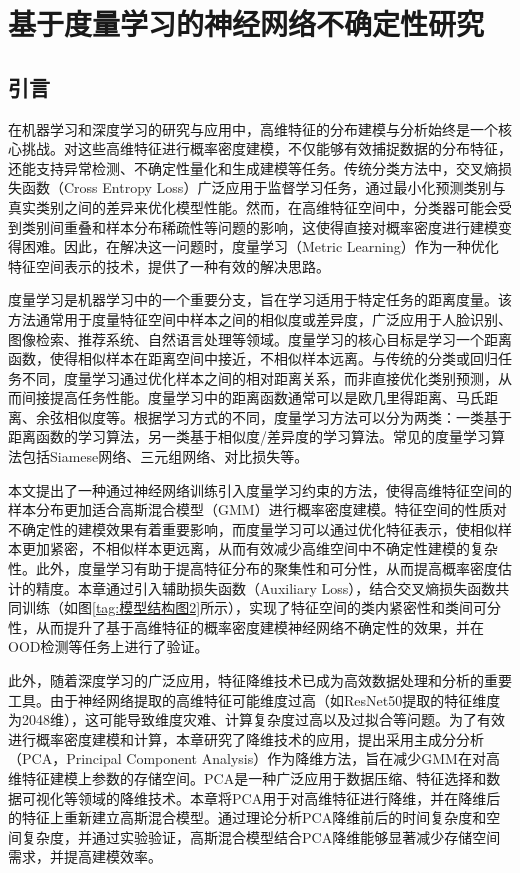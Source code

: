 

\chapter{基于度量学习的神经网络不确定性研究}
\section{引言}

在机器学习和深度学习的研究与应用中，高维特征的分布建模与分析始终是一个核心挑战。对这些高维特征进行概率密度建模，不仅能够有效捕捉数据的分布特征，还能支持异常检测、不确定性量化和生成建模等任务。传统分类方法中，交叉熵损失函数（Cross Entropy Loss）广泛应用于监督学习任务，通过最小化预测类别与真实类别之间的差异来优化模型性能。然而，在高维特征空间中，分类器可能会受到类别间重叠和样本分布稀疏性等问题的影响，这使得直接对概率密度进行建模变得困难。因此，在解决这一问题时，度量学习（Metric Learning）作为一种优化特征空间表示的技术，提供了一种有效的解决思路。

度量学习\cite{kaya2019deep}\cite{kulis2013metric}\cite{yang2566distance}是机器学习中的一个重要分支，旨在学习适用于特定任务的距离度量。该方法通常用于度量特征空间中样本之间的相似度或差异度，广泛应用于人脸识别、图像检索、推荐系统、自然语言处理等领域。度量学习的核心目标是学习一个距离函数，使得相似样本在距离空间中接近，不相似样本远离。与传统的分类或回归任务不同，度量学习通过优化样本之间的相对距离关系，而非直接优化类别预测，从而间接提高任务性能。度量学习中的距离函数通常可以是欧几里得距离、马氏距离、余弦相似度等。根据学习方式的不同，度量学习方法可以分为两类：一类基于距离函数的学习算法，另一类基于相似度/差异度的学习算法。常见的度量学习算法包括Siamese网络\cite{bromley1994signature}、三元组网络\cite{schroff2015facenet}、对比损失\cite{hadsell2566dimensionality}等。

本文提出了一种通过神经网络训练引入度量学习约束的方法，使得高维特征空间的样本分布更加适合高斯混合模型（GMM）进行概率密度建模。特征空间的性质对不确定性的建模效果有着重要影响，而度量学习可以通过优化特征表示，使相似样本更加紧密，不相似样本更远离，从而有效减少高维空间中不确定性建模的复杂性。此外，度量学习有助于提高特征分布的聚集性和可分性，从而提高概率密度估计的精度。本章通过引入辅助损失函数（Auxiliary Loss），结合交叉熵损失函数共同训练（如图\ref{tag:模型结构图2}所示），实现了特征空间的类内紧密性和类间可分性，从而提升了基于高维特征的概率密度建模神经网络不确定性的效果，并在OOD检测等任务上进行了验证。

此外，随着深度学习的广泛应用，特征降维技术已成为高效数据处理和分析的重要工具。由于神经网络提取的高维特征可能维度过高（如ResNet50提取的特征维度为2048维），这可能导致维度灾难\cite{murphy2012machine}、计算复杂度过高以及过拟合等问题。为了有效进行概率密度建模和计算，本章研究了降维技术的应用，提出采用主成分分析（PCA，Principal Component Analysis）作为降维方法，旨在减少GMM在对高维特征建模上参数的存储空间。PCA是一种广泛应用于数据压缩、特征选择和数据可视化等领域的降维技术。本章将PCA用于对高维特征进行降维，并在降维后的特征上重新建立高斯混合模型。通过理论分析PCA降维前后的时间复杂度和空间复杂度，并通过实验验证，高斯混合模型结合PCA降维能够显著减少存储空间需求，并提高建模效率。



